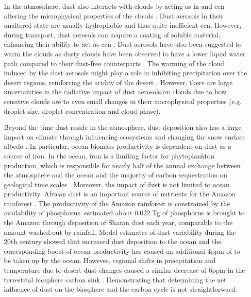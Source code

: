 In the atmosphere, dust also interacts with clouds by acting as \acrfull{in} and \acrfull{ccn} altering the microphysical properties of the clouds \parencite{lohmann2006sensitivity}. 
Dust aerosols in their unaltered state are usually hydrophobic and thus quite inefficient \acrshort{ccn}. 
However, during transport, dust aerosols can acquire a coating of soluble material, enhancing their ability to act as \acrshort{ccn} \parencite{Dust_aerosols_coating2001}. 
Dust aerosols have also been suggested to warm the clouds as dusty clouds have been observed to have a lower liquid water path compared to their dust-free counterparts \parencite{huang2006satellite}. 
The warming of the cloud induced by the dust aerosols might play a role in inhibiting precipitation over the desert regions, reinforcing the aridity of the desert \parencite{shao2011dust}.  However, there are large uncertainties in the radiative impact of dust aerosols on clouds due to how sensitive clouds are to even small changes in their microphysical properties (e.g. droplet size, droplet concentration and cloud phase).

Beyond the time dust reside in the atmosphere, dust deposition also has a large impact on climate through influencing ecosystems and changing the snow surface albedo \parencite{shao2011dust} . 
In particular, ocean biomass productivity is dependent on dust as a source of iron. In the ocean, iron is a limiting factor for phytoplankton production, which is responsible for nearly half of the annual  exchange between the atmosphere and the ocean and the majority of carbon sequestration on geological time scales \parencite{shao2011dust}. Moreover, the impact of dust is not limited to ocean productivity. African dust is an important source of nutrients for the Amazon rainforest . The productivity of the Amazon rainforest is constrained by the availability of phosphorus. \textcite{yu2015fertilizing} estimated about 0.022 Tg of phosphorus is brought to the Amazon through deposition of Sharan dust each year, comparable to the amount washed out by rainfall. Model estimates of dust variability during the 20th century showed that increased dust deposition to the ocean and the corresponding boost of ocean productivity has caused an additional 4ppm of  to be taken up by the ocean. However, regional shifts in precipitation and temperature due to desert dust changes caused a similar decrease of 6ppm  in the terrestrial biosphere carbon sink \parencite{mahowald2010observed}. Demonstrating that determining the net influence of dust on the biosphere and the carbon cycle is not straightforward.
